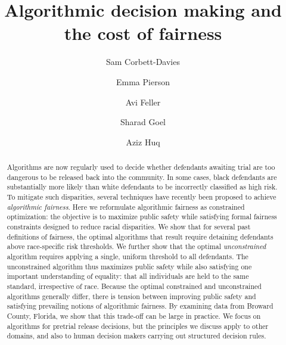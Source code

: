 \documentclass[sigconf]{acmart}
\begin{document}
\title{Algorithmic decision making and the cost of fairness}

\author{Sam Corbett-Davies}

\author{Emma Pierson}

\author{Avi Feller}

\author{Sharad Goel}

\author{Aziz Huq}

\begin{abstract}
Algorithms are now regularly used to decide whether defendants awaiting trial are too dangerous to be released back into the community. In some cases, black defendants are substantially more likely than white defendants to be incorrectly classified as high risk. 
To mitigate such disparities,
several techniques have recently been proposed to achieve
\emph{algorithmic fairness}. 
Here we reformulate algorithmic fairness as constrained optimization:
the objective is to maximize public safety 
while satisfying formal fairness constraints designed to reduce racial disparities.
We show that for several past definitions of fairness,
the optimal algorithms that result require 
detaining defendants above race-specific risk thresholds.
We further show that the optimal \emph{unconstrained} algorithm 
requires applying a single, uniform threshold to all defendants.
The unconstrained algorithm thus maximizes public safety while also satisfying one important understanding of equality: that all individuals are held to the same standard, irrespective of race.
Because the optimal constrained and unconstrained algorithms generally differ,
there is tension between improving public safety and satisfying prevailing notions of algorithmic fairness.
By examining data from Broward County, Florida,
we show that this trade-off can be large in practice.
We focus on algorithms for pretrial release decisions, but the principles we discuss apply to other domains, and also to human decision makers carrying out structured decision rules.
\end{abstract}
\end{document}
